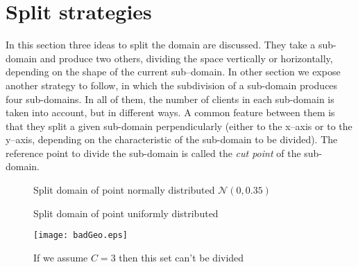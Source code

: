 
\section{Split strategies}

In this section three ideas to split the domain are discussed. They take a sub-domain and produce two others, dividing the space vertically or horizontally, depending on the shape of the current sub--domain. In other section we expose another strategy to follow, in which the subdivision of a sub-domain produces four sub-domains. In all of them, the number of clients in each sub-domain is taken into account, but in different ways. A common feature between them is that they split a given sub-domain perpendicularly (either to the x--axis or to the y--axis, depending on the characteristic of the sub-domain to be divided). The reference point to divide the sub-domain is called the {\it cut point} of the sub-domain.

\begin{figure}
	\centering
	\hspace{3pt}%
	\hspace{3pt}%
	\caption[]{Split domain of point normally distributed $\mathcal{N}\left(0,0.35\right)$}%
	\label{split:norm}
\end{figure}

\begin{figure}
	\centering
	\hspace{3pt}%
	\hspace{3pt}%
	\caption[]{Split domain of point uniformly distributed}%
	\label{split:unif}
\end{figure}

\begin{figure}
	\centering
	\texttt{[image: badGeo.eps]}
	\caption[]{If we assume $C = 3$ then this set can't be divided}%
	\label{fig:badGeom}
\end{figure}

